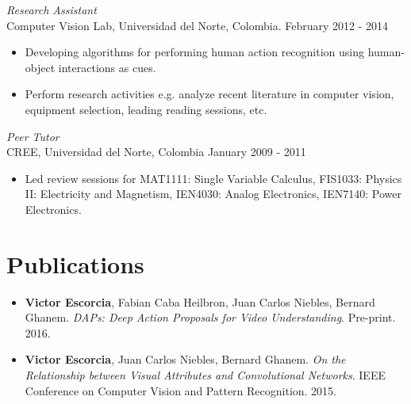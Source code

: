 \documentclass[margin]{res}
\begin{document}
\begin{resume}
 \textit{Research Assistant}\\
 Computer Vision Lab, Universidad del Norte, Colombia. \hfill February 2012 - 2014 \\
 \begin{itemize} \itemsep -2pt %
  \item Developing algorithms for performing human action recognition using
 human-object interactions as cues.
 \item Perform research activities e.g. analyze recent literature in computer
       vision, equipment selection, leading reading sessions, etc.
 \end{itemize}
 
 \textit{Peer Tutor}\\
 CREE, Universidad del Norte, Colombia \hfill January  2009 - 2011 \\
 \begin{itemize} \itemsep -2pt %
  \item Led review sessions for MAT1111: Single Variable Calculus, FIS1033:
 Physics II: Electricity and Magnetism, IEN4030: Analog Electronics,
 IEN7140: Power Electronics.
  \end{itemize}



\section{Publications} 
\begin{itemize} \itemsep -2pt %

\item \textbf{Victor Escorcia}, Fabian Caba Heilbron, Juan Carlos Niebles, Bernard Ghanem.
\textit{DAPs: Deep Action Proposals for Video Understanding}.
Pre-print. 2016.
\smallskip

\item \textbf{Victor Escorcia}, Juan Carlos Niebles, Bernard Ghanem.
\textit{On the Relationship between Visual Attributes and Convolutional
Networks}.
IEEE Conference on Computer Vision and Pattern Recognition. 2015.
\smallskip


\end{itemize}
\end{resume}
\end{document}

